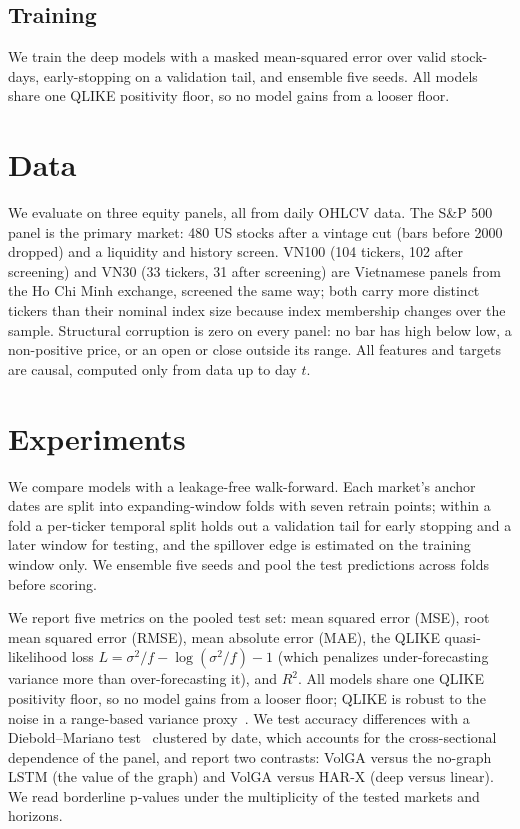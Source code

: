\documentclass{llncs}
\begin{document}
\subsection{Training}
We train the deep models with a masked mean-squared error over valid stock-days, early-stopping on a
validation tail, and ensemble five seeds. All models share one QLIKE positivity floor, so no model gains from
a looser floor.

\section{Data}
We evaluate on three equity panels, all from daily OHLCV data. The S\&P 500 panel is the primary market: 480
US stocks after a vintage cut (bars before 2000 dropped) and a liquidity and history screen. VN100 (104 tickers,
102 after screening) and VN30 (33 tickers, 31 after screening) are Vietnamese panels from the Ho Chi Minh
exchange, screened the same way; both carry more distinct tickers than their nominal index size because index membership changes over
the sample. Structural corruption is zero on every panel: no bar has high below low, a non-positive price, or an
open or close outside its range. All features and targets are causal, computed only from data up to day $t$.

\section{Experiments}
We compare models with a leakage-free walk-forward. Each market's anchor dates are split into expanding-window
folds with seven retrain points; within a fold a per-ticker temporal split holds out a validation tail for
early stopping and a later window for testing, and the spillover edge is estimated on the training window only.
We ensemble five seeds and pool the test predictions across folds before scoring.

We report five metrics on the pooled test set: mean squared error (MSE), root mean squared error (RMSE), mean
absolute error (MAE), the QLIKE quasi-likelihood loss $L = \sigma^2/f - \log(\sigma^2/f) - 1$ (which penalizes
under-forecasting variance more than over-forecasting it), and $R^2$. All models share one QLIKE positivity
floor, so no model gains from a looser floor; QLIKE is robust to the noise in a range-based variance
proxy~\cite{patton2011proxies}. We test accuracy differences with a Diebold--Mariano test~\cite{dm1995}
clustered by date, which accounts for the cross-sectional dependence of the panel, and report two contrasts:
VolGA versus the no-graph LSTM (the value of the graph) and VolGA versus HAR-X (deep versus linear). We read
borderline p-values under the multiplicity of the tested markets and horizons.
\end{document}
